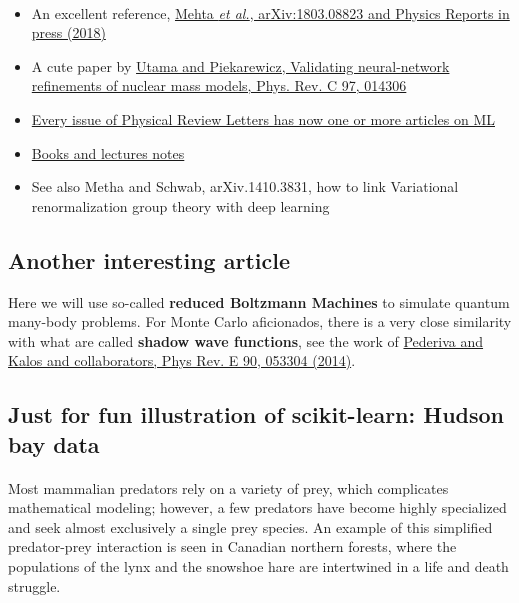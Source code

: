 \documentclass[%
oneside,                 %
final,                   %
10pt]{article}
\begin{document}
\paragraph{}
\begin{itemize}
\item An excellent reference, \href{{https://arxiv.org/abs/1803.08823}}{Mehta \emph{et al.}, arXiv:1803.08823 and Physics Reports in press (2018)}

\item A cute paper by \href{{https://journals.aps.org/prc/abstract/10.1103/PhysRevC.97.014306}}{Utama and Piekarewicz, Validating neural-network refinements of nuclear mass models, Phys. Rev. C 97, 014306}

\item \href{{https://journals.aps.org/prl/abstract/10.1103/PhysRevLett.120.156001}}{Every issue of Physical Review Letters has now one or more articles on ML}

\item \href{{https://github.com/CompPhysics/MachineLearning}}{Books and lectures notes}

\item See also Metha and Schwab, arXiv.1410.3831, how to link Variational renormalization group theory with deep learning
\end{itemize}

\noindent




\subsection{Another interesting article}

Here we will use so-called \textbf{reduced Boltzmann Machines} to simulate quantum many-body problems. For Monte Carlo aficionados, there is a very close similarity with what are called \textbf{shadow wave functions}, see the work of \href{{https://journals.aps.org/pre/abstract/10.1103/PhysRevE.90.053304}}{Pederiva and Kalos and collaborators, Phys Rev. E 90, 053304 (2014)}.

\subsection{Just for fun illustration of scikit-learn: Hudson bay data}

\paragraph{}
Most mammalian predators rely on a variety of prey, which complicates mathematical modeling; however, a few predators have become highly specialized and seek almost exclusively a single prey species. An example of this simplified predator-prey interaction is seen in Canadian northern forests, where the populations of the lynx and the snowshoe hare are intertwined in a life and death struggle.
\end{document}
